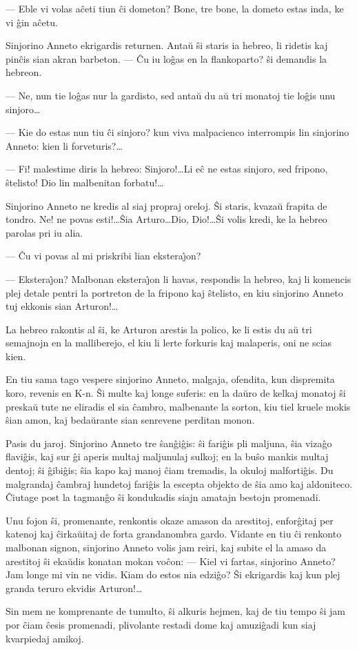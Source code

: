  --- Eble vi volas a\^ceti tiun \^ci dometon? Bone, tre bone, la dometo
estas inda, ke vi \^gin a\^cetu.

   Sinjorino Anneto ekrigardis returnen. Anta\u u \^si staris ia hebreo,
li ridetis kaj pin\^cis sian akran barbeton. --- \^Cu iu lo\^gas en
la flankoparto? \^si demandis la hebreon.

 --- Ne, nun tie lo\^gas nur la gardisto, sed anta\u u du a\u u tri monatoj
tie lo\^gis unu sinjoro\dots

 --- Kie do estas nun tiu \^ci sinjoro? kun viva malpacienco interrompis
lin sinjorino Anneto: kien li forveturis?\dots

 --- Fi! malestime diris la hebreo: Sinjoro!\dots Li e\^c ne estas
sinjoro, sed fripono, \^stelisto! Dio lin malbenitan forbatu!\dots

   Sinjorino Anneto ne kredis al siaj propraj oreloj. \^Si staris,
kvaza\u u frapita de tondro. Ne! ne povas esti!\dots \^Sia
Arturo\dots Dio, Dio!\dots \^Si volis kredi, ke la hebreo parolas
pri iu alia.

 --- \^Cu vi povas al mi priskribi lian ekstera\^{\j}on?

 --- Ekstera\^{\j}on? Malbonan ekstera\^{\j}on li havas, respondis la hebreo,
kaj li komencis plej detale pentri la portreton de la fripono kaj
\^stelisto, en kiu sinjorino Anneto tuj ekkonis sian Arturon!\dots

   La hebreo rakontis al \^si, ke Arturon arestis la polico, ke li estis
du a\u u tri semajnojn en la malliberejo, el kiu li lerte forkuris
kaj malaperis, oni ne scias kien.

   En tiu sama tago vespere sinjorino Anneto, malgaja, ofendita, kun
dispremita koro, revenis en K-n. \^Si multe kaj longe suferis: en la
da\u uro de kelkaj monatoj \^si preska\u u tute ne eliradis el sia
\^cambro, malbenante la sorton, kiu tiel kruele mokis \^sian amon,
kaj beda\u urante sian senrevene perditan monon.

\asterism{}

   Pasis du jaroj. Sinjorino Anneto tre \^san\^gi\^gis: \^si fari\^gis pli
maljuna, \^sia viza\^go flavi\^gis, kaj sur \^gi aperis multaj
maljunulaj sulkoj; en la bu\^so mankis multaj dentoj; \^si
\^gibi\^gis; \^sia kapo kaj manoj \^ciam tremadis, la okuloj
malforti\^gis. Du malgrandaj \^cambraj hundetoj fari\^gis la escepta
objekto de \^sia amo kaj aldoniteco. \^Ciutage post la tagman\^go
\^si kondukadis siajn amatajn bestojn promenadi.

   Unu fojon \^si, promenante, renkontis okaze amason da arestitoj,
enfor\^gitaj per katenoj kaj \^cirka\u uitaj de forta grandanombra
gardo. Vidante en tiu \^ci renkonto malbonan signon, sinjorino
Anneto volis jam reiri, kaj subite el la amaso da arestitoj \^si
eka\u udis konatan mokan vo\^con: --- Kiel vi fartas, sinjorino
Anneto? Jam longe mi vin ne vidis. Kiam do estos nia edzi\^go? \^Si
ekrigardis kaj kun plej granda teruro ekvidis Arturon!\dots

   Sin mem ne komprenante de tumulto, \^si alkuris hejmen, kaj de tiu
tempo \^si jam por \^ciam \^cesis promenadi, plivolante restadi dome
kaj amuzi\^gadi kun siaj kvarpiedaj amikoj.

\smallrule{}
